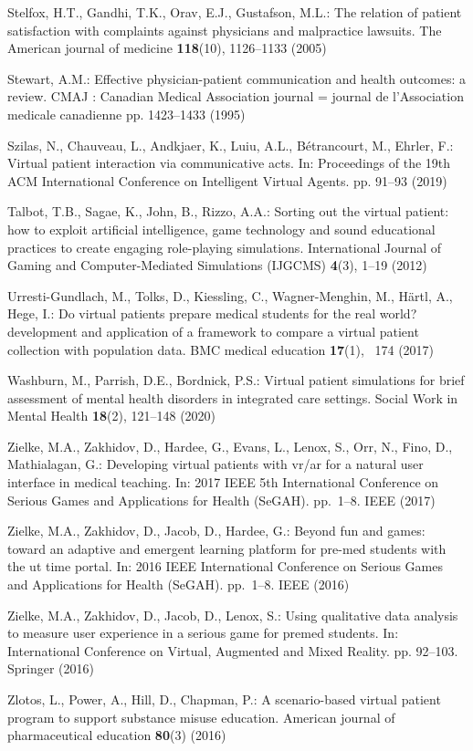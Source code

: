 \documentclass[runningheads]{llncs}
\begin{document}
\begin{thebibliography}{10}
Stelfox, H.T., Gandhi, T.K., Orav, E.J., Gustafson, M.L.: The relation of
  patient satisfaction with complaints against physicians and malpractice
  lawsuits. The American journal of medicine  \textbf{118}(10),  1126--1133
  (2005)

Stewart, A.M.: Effective physician-patient communication and health outcomes: a
  review. CMAJ : Canadian Medical Association journal = journal de
  l'Association medicale canadienne pp. 1423--1433 (1995)

Szilas, N., Chauveau, L., Andkjaer, K., Luiu, A.L., B{\'e}trancourt, M.,
  Ehrler, F.: Virtual patient interaction via communicative acts. In:
  Proceedings of the 19th ACM International Conference on Intelligent Virtual
  Agents. pp. 91--93 (2019)

Talbot, T.B., Sagae, K., John, B., Rizzo, A.A.: Sorting out the virtual
  patient: how to exploit artificial intelligence, game technology and sound
  educational practices to create engaging role-playing simulations.
  International Journal of Gaming and Computer-Mediated Simulations (IJGCMS)
  \textbf{4}(3),  1--19 (2012)

Urresti-Gundlach, M., Tolks, D., Kiessling, C., Wagner-Menghin, M., H{\"a}rtl,
  A., Hege, I.: Do virtual patients prepare medical students for the real
  world? development and application of a framework to compare a virtual
  patient collection with population data. BMC medical education
  \textbf{17}(1), ~174 (2017)

Washburn, M., Parrish, D.E., Bordnick, P.S.: Virtual patient simulations for
  brief assessment of mental health disorders in integrated care settings.
  Social Work in Mental Health  \textbf{18}(2),  121--148 (2020)

Zielke, M.A., Zakhidov, D., Hardee, G., Evans, L., Lenox, S., Orr, N., Fino,
  D., Mathialagan, G.: Developing virtual patients with vr/ar for a natural
  user interface in medical teaching. In: 2017 IEEE 5th International
  Conference on Serious Games and Applications for Health (SeGAH). pp.~1--8.
  IEEE (2017)

Zielke, M.A., Zakhidov, D., Jacob, D., Hardee, G.: Beyond fun and games: toward
  an adaptive and emergent learning platform for pre-med students with the ut
  time portal. In: 2016 IEEE International Conference on Serious Games and
  Applications for Health (SeGAH). pp.~1--8. IEEE (2016)

Zielke, M.A., Zakhidov, D., Jacob, D., Lenox, S.: Using qualitative data
  analysis to measure user experience in a serious game for premed students.
  In: International Conference on Virtual, Augmented and Mixed Reality. pp.
  92--103. Springer (2016)

Zlotos, L., Power, A., Hill, D., Chapman, P.: A scenario-based virtual patient
  program to support substance misuse education. American journal of
  pharmaceutical education  \textbf{80}(3) (2016)

\end{thebibliography}
%
\end{document}

